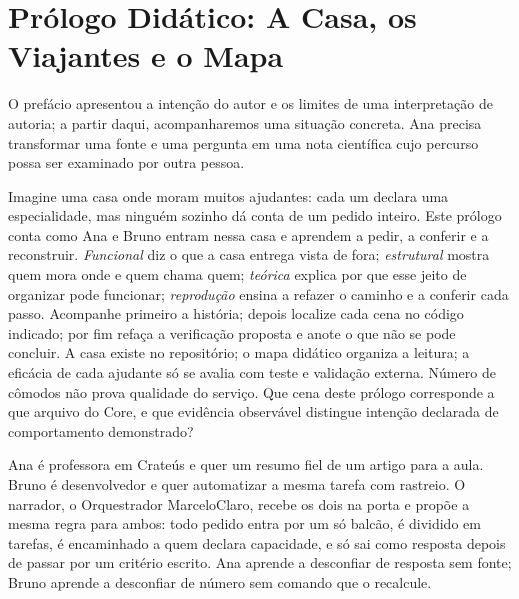 \chapter{Pr\'ologo Did\'atico: A Casa, os Viajantes e o Mapa}

O prefácio apresentou a intenção do autor e os limites de uma interpretação de autoria; a partir daqui, acompanharemos uma situação concreta. Ana precisa transformar uma fonte e uma pergunta em uma nota científica cujo percurso possa ser examinado por outra pessoa.


\roteirodidatico
{Imagine uma casa onde moram muitos ajudantes: cada um declara uma especialidade, mas ningu\'em sozinho d\'a conta de um pedido inteiro. Este pr\'ologo conta como Ana e Bruno entram nessa casa e aprendem a pedir, a conferir e a reconstruir.}
{\emph{Funcional} diz o que a casa entrega vista de fora; \emph{estrutural} mostra quem mora onde e quem chama quem; \emph{te\'orica} explica por que esse jeito de organizar pode funcionar; \emph{reprodu\c{c}\~ao} ensina a refazer o caminho e a conferir cada passo.}
{Acompanhe primeiro a hist\'oria; depois localize cada cena no c\'odigo indicado; por fim refa\c{c}a a verifica\c{c}\~ao proposta e anote o que n\~ao se pode concluir.}
{A casa existe no reposit\'orio; o mapa did\'atico organiza a leitura; a efic\'acia de cada ajudante s\'o se avalia com teste e valida\c{c}\~ao externa. N\'umero de c\^omodos n\~ao prova qualidade do servi\c{c}o.}
{Que cena deste pr\'ologo corresponde a que arquivo do Core, e que evid\^encia observ\'avel distingue inten\c{c}\~ao declarada de comportamento demonstrado?}

{Ana \'e professora em Crate\'us e quer um resumo fiel de um artigo para a aula. Bruno \'e desenvolvedor e quer automatizar a mesma tarefa com rastreio. O narrador, o Orquestrador MarceloClaro, recebe os dois na porta e prop\~oe a mesma regra para ambos: todo pedido entra por um s\'o balc\~ao, \'e dividido em tarefas, \'e encaminhado a quem declara capacidade, e s\'o sai como resposta depois de passar por um crit\'erio escrito. Ana aprende a desconfiar de resposta sem fonte; Bruno aprende a desconfiar de n\'umero sem comando que o recalcule.}

